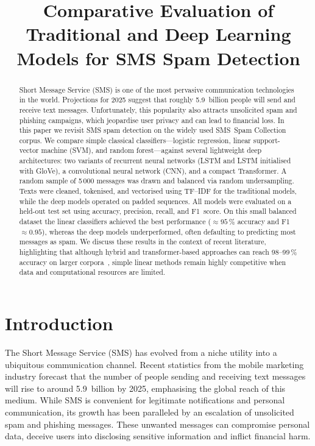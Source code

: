 \documentclass[conference]{IEEEtran}
\title{Comparative Evaluation of Traditional and Deep Learning Models for SMS Spam Detection}
\author{
\IEEEauthorblockN{Luis Alejandro Guillen Álvarez}
\IEEEauthorblockA{Facultad de Ingeniería\\
Universidad Panamericana\\
Ciudad de México, México\\
0234598@up.edu.mx}
}
\begin{document}
\maketitle

\begin{abstract}
Short Message Service (SMS) is one of the most pervasive communication technologies in the world. Projections for 2025 suggest that roughly 5.9~billion people will send and receive text messages. Unfortunately, this popularity also attracts unsolicited spam and phishing campaigns, which jeopardise user privacy and can lead to financial loss. In this paper we revisit SMS spam detection on the widely used SMS~Spam Collection corpus. We compare simple classical classifiers---logistic regression, linear support-vector machine (SVM), and random forest---against several lightweight deep architectures: two variants of recurrent neural networks (LSTM and LSTM initialised with GloVe), a convolutional neural network (CNN), and a compact Transformer. A random sample of 5\,000 messages was drawn and balanced via random undersampling. Texts were cleaned, tokenised, and vectorised using TF--IDF for the traditional models, while the deep models operated on padded sequences. All models were evaluated on a held-out test set using accuracy, precision, recall, and F1~score. On this small balanced dataset the linear classifiers achieved the best performance ($\approx 95\,\%$ accuracy and F1~$\approx 0.95$), whereas the deep models underperformed, often defaulting to predicting most messages as spam. We discuss these results in the context of recent literature, highlighting that although hybrid and transformer-based approaches can reach 98--99\,\% accuracy on larger corpora~\cite{liu2021,bilgen2024}, simple linear methods remain highly competitive when data and computational resources are limited.
\end{abstract}


\section{Introduction}

The Short Message Service (SMS) has evolved from a niche utility into a ubiquitous communication channel.  Recent statistics from the mobile marketing industry forecast that the number of people sending and receiving text messages will rise to around 5.9~billion by 2025, emphasising the global reach of this medium.  While SMS is convenient for legitimate notifications and personal communication, its growth has been paralleled by an escalation of unsolicited spam and phishing messages.  These unwanted messages can compromise personal data, deceive users into disclosing sensitive information and inflict financial harm.
\end{document}
